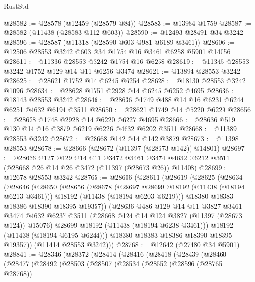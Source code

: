 \begin{lexlean}{RustStd}
\begin{coremodule}
@28582 := @28578 (@12459 (@28579 @84))
@28583 := @13984 @1759
@28587 := @28582 (@11438 (@28583 @112 @603))
@28590 := @12493 @28491 @34 @3242
@28596 := @28587 (@11318 (@28590 @603 @981 @6189 @3461))
@28606 := @12506 @28553 @3242 @603 @34 @1754 @16 @3461 @6258 @5901 @14056
@28611 := @11336 @28553 @3242 @1754 @16 @6258
@28619 := @11345 @28553 @3242 @1752 @129 @14 @11 @6256 @3474
@28621 := @13894 @28553 @3242
@28625 := @28621 @1752 @14 @6245 @6254
@28628 := @18130 @28553 @3242 @1096
@28634 := @28628 @1751 @2928 @14 @6245 @6252 @4695
@28636 := @18143 @28553 @3242
@28646 := @28636 @1749 @488 @14 @16 @6231 @6244 @6251 @4632 @6194 @3511
@28650 := @28621 @1749 @14 @6220 @6229
@28656 := @28628 @1748 @2928 @14 @6220 @6227 @4695
@28666 := @28636 @519 @130 @14 @16 @3879 @6219 @6226 @4632 @6202 @3511
@28668 := @11389 @28553 @3242
@28672 := @28668 @142 @14 @142 @3879
@28673 := @11398 @28553
@28678 := @28666 (@28672 (@11397 (@28673 @142)) @14801)
@28697 := @28636
    @127
    @129
    @14
    @11
    @3472
    @3461
    @3474
    @4632
    @6212
    @3511
    (@28668 @26 @14 @26 @3472 (@11397 (@28673 @26)) @11408)
@28699 := @12678 @28553 @3242
@28765 := @28606
    (@28611
      (@28619
        (@28625
          (@28634
            (@28646
              (@28650
                (@28656
                  (@28678
                    (@28697 @28699 @18192 (@11438 (@18194 @6213 @3461)))
                    @18192
                    (@11438 (@18194 @6203 @6219)))
                  @18380
                  @18383
                  @18386
                  @18390
                  @18395
                  @19357))
              (@28636
                @486
                @129
                @14
                @11
                @3827
                @3461
                @3474
                @4632
                @6237
                @3511
                (@28668 @124 @14 @124 @3827 (@11397 (@28673 @124)) @15076)
                @28699
                @18192
                (@11438 (@18194 @6238 @3461)))
              @18192
              (@11438 (@18194 @6195 @6244)))
            @18380
            @18383
            @18386
            @18390
            @18395
            @19357))
        (@11414 @28553 @3242)))
@28768 := @12642 (@27480 @34 @5901)
@28841 := @28346
    (@28372
      (@28414
        (@28416
          (@28418
            (@28439
              (@28460
                (@28477
                  (@28492
                    (@28503
                      (@28507
                        (@28534
                          (@28552
                            (@28596 (@28765 @28768))

\end{coremodule}
\end{lexlean}
